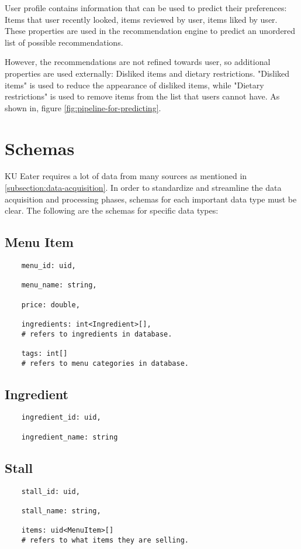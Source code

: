 User profile contains information that can be used to predict their preferences: Items that user recently looked, items reviewed by user, items liked by user.
These properties are used in the recommendation engine to predict an unordered list of possible recommendations.

However, the recommendations are not refined towards user, so additional properties are used externally: Disliked items and dietary restrictions.
"Disliked items" is used to reduce the appearance of disliked items, while "Dietary restrictions" is used to remove items from the list that users
cannot have. As shown in, figure \ref{fig:pipeline-for-predicting}.

\section{Schemas}
\label{section:data-schema}

KU Eater requires a lot of data from many sources as mentioned in \ref{subsection:data-acquisition}. In order to standardize and streamline the
data acquisition and processing phases, schemas for each important data type must be clear. The following are the schemas for specific data types:

\subsection{Menu Item}
\label{schema:menu-item}
\begin{verbatim}
    menu_id: uid,
    
    menu_name: string,

    price: double,
    
    ingredients: int<Ingredient>[],
    # refers to ingredients in database.
    
    tags: int[]
    # refers to menu categories in database.
\end{verbatim}

\subsection{Ingredient}
\label{schema:ingredient}
\begin{verbatim}
    ingredient_id: uid,
    
    ingredient_name: string
\end{verbatim}

\subsection{Stall}
\label{schema:stall}
\begin{verbatim}
    stall_id: uid,

    stall_name: string,

    items: uid<MenuItem>[]
    # refers to what items they are selling.
\end{verbatim}

